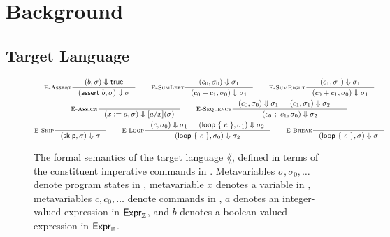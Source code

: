 \documentclass[p.tex]{subfiles}
\begin{document}
\section{Background}\label{sec:background}

\subsection{Target Language}\label{sec:language}

\begin{figure}
\begin{spreadlines}{5pt}
\begin{gather*}
  \inference[\textsc{E-Assert}]{%
    \eeval{b}{\sigma}{\btrue}
  }{%
    \ceval{\cassert{b}}{\sigma}{\sigma}
  }
  \qquad
  \inference[\textsc{E-SumLeft}]{%
    \ceval{c_0}{\sigma_0}{\sigma_1}
  }{%
    \ceval{\csum{c_0}{c_1}}{\sigma_0}{\sigma_1}
  }
  \qquad
  \inference[\textsc{E-SumRight}]{%
    \ceval{c_1}{\sigma_0}{\sigma_1}
  }{%
    \ceval{\csum{c_0}{c_1}}{\sigma_0}{\sigma_1}
  }
  \\
  \inference[\textsc{E-Assign}]{%
  }{%
    \ceval{\cassign{x}{a}}{\sigma}{\subst{x}{a}{(\sigma)}}
  }
  \qquad
  \inference[\textsc{E-Sequence}]{%
    \ceval{c_0}{\sigma_0}{\sigma_1}&
    \ceval{c_1}{\sigma_1}{\sigma_2}&
  }{%
    \ceval{\cseq{c_0}{c_1}}{\sigma_0}{\sigma_2}
  }
  \\
  \inference[\textsc{E-Skip}]{%
  }{%
    \ceval{\cskip}{\sigma}{\sigma}
  }
  \qquad
  \inference[\textsc{E-Loop}]{%
    \ceval{c}{\sigma_0}{\sigma_1}&
    \ceval{\cloop{c}}{\sigma_1}{\sigma_2}
  }{%
    \ceval{\cloop{c}}{\sigma_0}{\sigma_2}
  }
  \qquad
  \inference[\textsc{E-Break}]{%
  }{%
    \ceval{\cloop{c}}{\sigma}{\sigma}
  }
\end{gather*}
\end{spreadlines}
  \caption{%
    The formal semantics of the target language $\lang$, defined in
    terms of the constituent imperative commands in \com.
    Metavariables $\sigma, \sigma_0, \ldots$ denote program states in
    \state, metavariable $x$ denotes a variable in \var, metavariables
    $c, c_0, \ldots$ denote commands in \com, $a$ denotes an
    integer-valued expression in $\textsf{Expr}_{\mathbb{Z}}$, and $b$ denotes a
    boolean-valued expression in $\textsf{Expr}_{\mathbb{B}}$.
  }\label{fig:semantics}
\end{figure}
\end{document}

